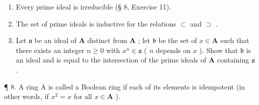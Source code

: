 \begin{enumerate}
\def\labelenumi{(\alph{enumi})}
\item
  Every prime ideal is irreducible (§ 8, Exercise 11).
\item
  The set of prime ideals is inductive for the relations \(\subset\) and \(\supset\) .
\item
  Let \(\mathfrak{a}\) be an ideal of \(\mathbf{A}\) distinct from \(\mathbf{A}\) ; let \(\mathfrak{b}\) be the set of \(x \in \mathbf{A}\) such that there exists an integer \(n \geqslant 0\) with \(x^n \in \mathfrak{a}\) ( \(n\) depends on \(x\) ). Show that \(\mathfrak{b}\) is an ideal and is equal to the intersection of the prime ideals of \(\mathbf{A}\) containing \(\mathfrak{a}\) .
\end{enumerate}

¶ 8. A ring A is called a Boolean ring if each of its elements is idempotent (in other words, if \(x^2 = x\) for all \(x \in \mathbf{A}\) ).

